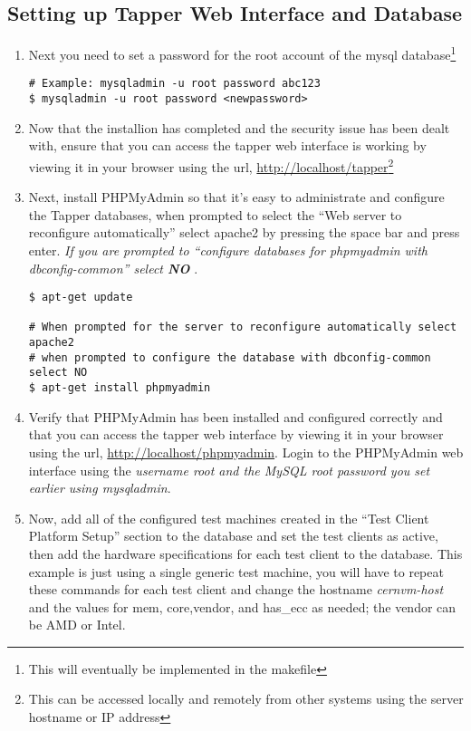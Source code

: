 \subsection{Setting up Tapper Web Interface and Database}
\begin{enumerate}
\item 	Next you need to set a password for the root account of the mysql database\footnote{This will eventually be implemented in the 
		makefile}
\lstset{caption= Set MySQL Root Password}
\begin{lstlisting}
# Example: mysqladmin -u root password abc123
$ mysqladmin -u root password <newpassword>
\end{lstlisting}

\item 	Now that the installion has completed and the security issue has been dealt with, ensure that you can access the tapper web
		interface is working by viewing it in your browser using the url, \url{http://localhost/tapper}\footnote{This can be accessed
		locally and remotely from other systems using the server hostname or IP address}

\item 	Next, install PHPMyAdmin so that it's easy to administrate and configure the Tapper databases, when prompted to select the
		``Web server to reconfigure automatically'' select apache2 by pressing the space bar and press enter. \emph{If you are 
		prompted to ``configure databases for phpmyadmin with dbconfig-common'' select {\bf NO} }.
\lstset{caption= Install PHPMyAdmin}
\begin{lstlisting}
$ apt-get update

# When prompted for the server to reconfigure automatically select apache2
# when prompted to configure the database with dbconfig-common select NO
$ apt-get install phpmyadmin
\end{lstlisting}

\item	Verify that PHPMyAdmin has been installed and configured correctly and that you can access the tapper web
		interface by viewing it in your browser using the url, \url{http://localhost/phpmyadmin}. Login to the PHPMyAdmin
		web interface using the \emph{username root and the MySQL root password you set earlier using mysqladmin}.

\item 	Now, add all of the configured test machines created in the ``Test Client Platform Setup'' section to the
		\tapper database and set the test clients as active, then add the hardware specifications for each test client
		to the database. This example is just using a single generic test machine, you will have to repeat these commands
		for each test client and change the hostname \emph{cernvm-host} and the values for mem, core,vendor, and has\_ecc 
		as needed; the vendor can be AMD or Intel.
		

\end{enumerate}
